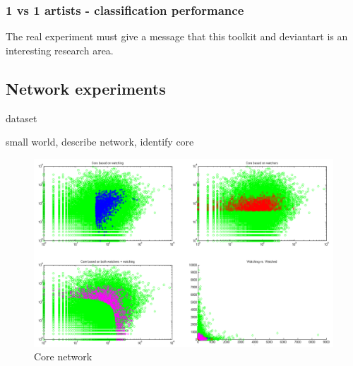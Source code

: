\subsubsection{1 vs 1 artists - classification performance}
The real experiment must give a message that this toolkit and deviantart is an interesting research area.

\subsection{Network experiments}
dataset

small world, describe network, identify core

\begin{figure}[htb]
  \centering
  \includegraphics[width=1\linewidth]{img/core.png}
  \caption{Core network}
  \label{fig:results_core}
\end{figure}